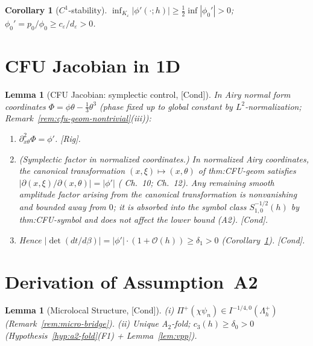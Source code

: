 \documentclass[12pt,a4paper]{amsart}
\newtheorem{lemma}[theorem]{Lemma}
\newtheorem{corollary}[theorem]{Corollary}
\theoremstyle{definition}
\theoremstyle{remark}
\newcommand{\Rig}{\textup{[Rig]}}
\newcommand{\Cond}{\textup{[Cond]}}
\begin{document}
\begin{corollary}[$C^1$-stability]
\label{cor:phi-C1}
$\inf_{K_\varepsilon}|\phi'(\cdot;h)|\ge\tfrac12\inf|\phi_0'|>0$;
$\phi_0'=p_0/\phi_0\ge c_\varepsilon/d_\varepsilon>0$.
\end{corollary}

\section{CFU Jacobian in 1D}
\label{sec:cfu-jacobian}

\begin{lemma}[CFU Jacobian: symplectic control, \Cond]
\label{lem:cfu-jacobian-1d}
In Airy normal form coordinates $\Phi=\phi\theta-\tfrac13\theta^3$
(phase fixed up to global constant by $L^2$-normalization;
Remark~\ref{rem:cfu-geom-nontrivial}(iii)):
\begin{enumerate}[{\rm(i)}]
\item $\partial^2_{x\theta}\Phi=\phi'$. \Rig.
\item \textit{(Symplectic factor in normalized coordinates.)}
  In normalized Airy coordinates, the canonical transformation
  $(x,\xi)\mapsto(x,\theta)$ of thm:CFU-geom satisfies
  $|\partial(x,\xi)/\partial(x,\theta)|=|\phi'|$
  (\cite{Olver1974} Ch.~10; \cite{Zworski2012} Ch.~12).
  Any remaining smooth amplitude factor arising from the
  canonical transformation is nonvanishing and bounded away from $0$;
  it is absorbed into the symbol class $S^{-1/2}_{1,0}(h)$
  by thm:CFU-symbol and does not affect the lower bound (A2). \Cond.
\item Hence $|\det(dt/d\beta)|=|\phi'|\cdot(1+\mathcal{O}(h))\ge\delta_1>0$
  (Corollary~\ref{cor:phi-C1}). \Cond.
\end{enumerate}
\end{lemma}

\section{Derivation of Assumption~A2}
\label{sec:a2-derivation}

\begin{lemma}[Microlocal Structure, \Cond]
\label{lem:olver-fio-lift-micro}
(i) $\Pi^+(\chi\psi_n)\in I^{-1/4,0}(\Lambda_h^+)$
(Remark~\ref{rem:micro-bridge}).
(ii) Unique A$_2$-fold; $c_3(h)\ge\delta_0>0$
(Hypothesis~\ref{hyp:a2-fold}(F1) + Lemma~\ref{lem:vpp}).
\end{lemma}
\end{document}
